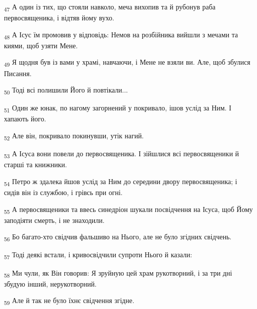 \begin{tcolorbox}
\textsubscript{47} А один із тих, що стояли навколо, меча вихопив та й рубонув раба первосвященика, і відтяв йому вухо.
\end{tcolorbox}
\begin{tcolorbox}
\textsubscript{48} А Ісус їм промовив у відповідь: Немов на розбійника вийшли з мечами та киями, щоб узяти Мене.
\end{tcolorbox}
\begin{tcolorbox}
\textsubscript{49} Я щодня був із вами у храмі, навчаючи, і Мене не взяли ви. Але, щоб збулися Писання.
\end{tcolorbox}
\begin{tcolorbox}
\textsubscript{50} Тоді всі полишили Його й повтікали...
\end{tcolorbox}
\begin{tcolorbox}
\textsubscript{51} Один же юнак, по нагому загорнений у покривало, ішов услід за Ним. І хапають його.
\end{tcolorbox}
\begin{tcolorbox}
\textsubscript{52} Але він, покривало покинувши, утік нагий.
\end{tcolorbox}
\begin{tcolorbox}
\textsubscript{53} А Ісуса вони повели до первосвященика. І зійшлися всі первосвященики й старші та книжники.
\end{tcolorbox}
\begin{tcolorbox}
\textsubscript{54} Петро ж здалека йшов услід за Ним до середини двору первосвященика; і сидів він із службою, і грівсь при огні.
\end{tcolorbox}
\begin{tcolorbox}
\textsubscript{55} А первосвященики та ввесь синедріон шукали посвідчення на Ісуса, щоб Йому заподіяти смерть, і не знаходили.
\end{tcolorbox}
\begin{tcolorbox}
\textsubscript{56} Бо багато-хто свідчив фальшиво на Нього, але не було згідних свідчень.
\end{tcolorbox}
\begin{tcolorbox}
\textsubscript{57} Тоді деякі встали, і кривосвідчили супроти Нього й казали:
\end{tcolorbox}
\begin{tcolorbox}
\textsubscript{58} Ми чули, як Він говорив: Я зруйную цей храм рукотворний, і за три дні збудую інший, нерукотворний.
\end{tcolorbox}
\begin{tcolorbox}
\textsubscript{59} Але й так не було їхнє свідчення згідне.
\end{tcolorbox}

